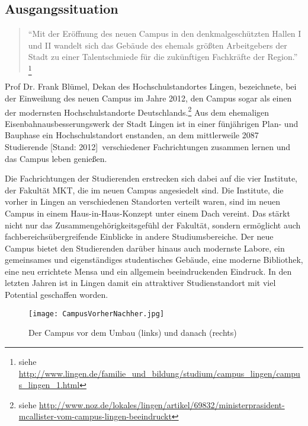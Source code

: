\subsection{Ausgangssituation}
\label{sec:Ausgangssituation}

\begin{quote}
"`Mit der Eröffnung des neuen Campus in den denkmalgeschützten Hallen I und II wandelt 
sich das Gebäude des ehemals größten Arbeitgebers der Stadt zu einer 
Talentschmiede für die zukünftigen Fachkräfte der Region."'
\footnote{siehe \url{http://www.lingen.de/familie_und_bildung/studium/campus_lingen/campus_lingen_1.html}}
\end{quote}

Prof Dr. Frank Blümel, Dekan des Hochschulstandortes Lingen, bezeichnete, bei der Einweihung
des neuen Campus im Jahre 2012, den Campus sogar als einen der modernsten Hochschulstandorte
Deutschlands.\footnote{siehe \url{http://www.noz.de/lokales/lingen/artikel/69832/ministerprasident-mcallister-vom-campus-lingen-beeindruckt}}
Aus dem ehemaligen Eisenbahnausbesserungswerk der Stadt Lingen ist in einer fünjährigen Plan- und Bauphase
ein Hochschulstandort enstanden, an dem mittlerweile 2087 Studierende [Stand: 2012]\footnotemark\ verschiedener
Fachrichtungen zusammen lernen und das Campus leben genießen.

Die Fachrichtungen der Studierenden erstrecken sich dabei auf die vier Institute, der Fakultät \ac{MKT}, die im neuen Campus angesiedelt sind. Die Institute, die vorher in Lingen an verschiedenen
Standorten verteilt waren, sind im neuen Campus in einem Haus-in-Haus-Konzept unter einem Dach vereint.
Das stärkt nicht nur das Zusammengehörigkeitsgefühl der Fakultät, sondern ermöglicht auch fachbereichsübergreifende
Einblicke in andere Studiumsbereiche. Der neue Campus bietet den Studierenden darüber hinaus auch modernste
Labore, ein gemeinsames und eigenständiges studentisches Gebäude, eine moderne Bibliothek, eine neu errichtete Mensa
und ein allgemein beeindruckenden Eindruck. In den letzten Jahren ist in Lingen damit ein attraktiver
Studienstandort mit viel Potential geschaffen worden.

\begin{figure}[htb] 
\centering
\texttt{[image: CampusVorherNachher.jpg]}
\caption[Vorher-Nachher-Vergleich]{Der Campus vor dem Umbau (links) und danach (rechts)\protect\footnotemark}
\label{fig:CampusVorher}
\end{figure}

